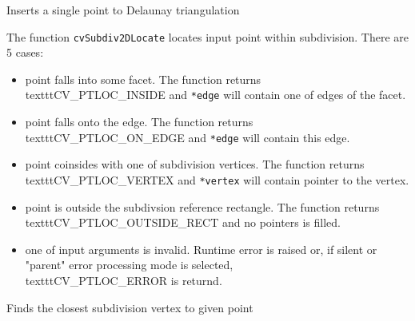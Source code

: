 \label{Subdiv2DLocate}

Inserts a single point to Delaunay triangulation


\begin{description}
\end{description}

The function \texttt{cvSubdiv2DLocate} locates input point within subdivision. There are 5 cases:

\begin{itemize}
 \item point falls into some facet. The function returns \\texttt{CV\_PTLOC\_INSIDE} and \texttt{*edge} will contain one of edges of the facet.
 \item point falls onto the edge. The function returns \\texttt{CV\_PTLOC\_ON\_EDGE} and \texttt{*edge} will contain this edge.
 \item point coinsides with one of subdivision vertices. The function returns \\texttt{CV\_PTLOC\_VERTEX} and \texttt{*vertex} will contain pointer to the vertex.
 \item point is outside the subdivsion reference rectangle. The function returns \\texttt{CV\_PTLOC\_OUTSIDE\_RECT} and no pointers is filled.
 \item one of input arguments is invalid. Runtime error is raised or, if silent or "parent" error processing mode is selected, \\texttt{CV\_PTLOC\_ERROR} is returnd.
\end{itemize}

\label{FindNearestPoint2D}

Finds the closest subdivision vertex to given point


